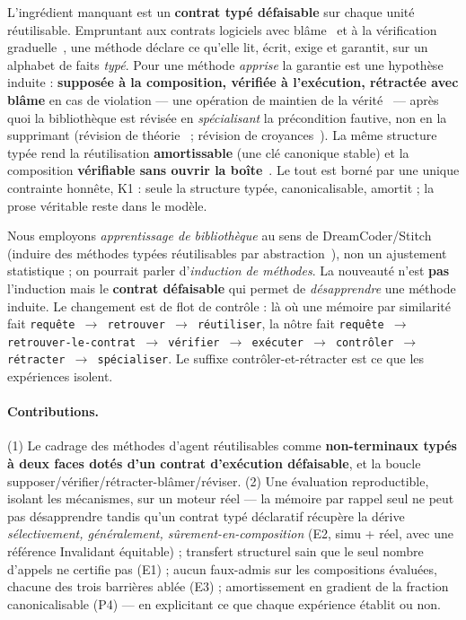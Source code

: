 \documentclass[11pt]{article}
\newcommand{\K}{\textsf{K1}}
\begin{document}
L'ingrédient manquant est un \textbf{contrat typé défaisable} sur chaque unité réutilisable. Empruntant aux
contrats logiciels avec blâme~\cite{findler2002} et à la vérification graduelle~\cite{bader2018}, une méthode
déclare ce qu'elle lit, écrit, exige et garantit, sur un alphabet de faits \emph{typé}. Pour une méthode
\emph{apprise} la garantie est une hypothèse induite : \textbf{supposée à la composition, vérifiée à l'exécution,
rétractée avec blâme} en cas de violation --- une opération de maintien de la vérité~\cite{doyle1979,dekleer1986}
--- après quoi la bibliothèque est révisée en \emph{spécialisant} la précondition fautive, non en la supprimant
(révision de théorie~\cite{ourston1994,richards1995} ; révision de croyances~\cite{agm1985}). La même structure
typée rend la réutilisation \textbf{amortissable} (une clé canonique stable) et la composition \textbf{vérifiable
sans ouvrir la boîte}~\cite{ohearn2001,reynolds2002}. Le tout est borné par une unique contrainte honnête, \K{} :
seule la structure typée, canonicalisable, amortit ; la prose véritable reste dans le modèle.

Nous employons \emph{apprentissage de bibliothèque} au sens de DreamCoder/Stitch~\cite{ellis2021,bowers2023}
(induire des méthodes typées réutilisables par abstraction~\cite{plotkin1970}), non un ajustement statistique ; on
pourrait parler d'\emph{induction de méthodes}. La nouveauté n'est \textbf{pas} l'induction mais le \textbf{contrat
défaisable} qui permet de \emph{désapprendre} une méthode induite. Le changement est de flot de contrôle : là où
une mémoire par similarité fait \texttt{requête $\to$ retrouver $\to$ réutiliser}, la nôtre fait
\texttt{requête $\to$ retrouver-le-contrat $\to$ vérifier $\to$ exécuter $\to$ contrôler $\to$ rétracter $\to$
spécialiser}. Le suffixe contrôler-et-rétracter est ce que les expériences isolent.

\paragraph{Contributions.} (1) Le cadrage des méthodes d'agent réutilisables comme \textbf{non-terminaux typés à
deux faces dotés d'un contrat d'exécution défaisable}, et la boucle supposer/vérifier/rétracter-blâmer/réviser. (2)
Une évaluation reproductible, isolant les mécanismes, sur un moteur réel --- la mémoire par rappel seul ne peut pas
désapprendre tandis qu'un contrat typé déclaratif récupère la dérive \emph{sélectivement, généralement,
sûrement-en-composition} (E2, simu + réel, avec une référence Invalidant équitable) ; transfert structurel sain que
le seul nombre d'appels ne certifie pas (E1) ; aucun faux-admis sur les compositions évaluées, chacune des trois
barrières ablée (E3) ; amortissement en gradient de la fraction canonicalisable (P4) --- en explicitant ce que
chaque expérience établit ou non.
\end{document}
